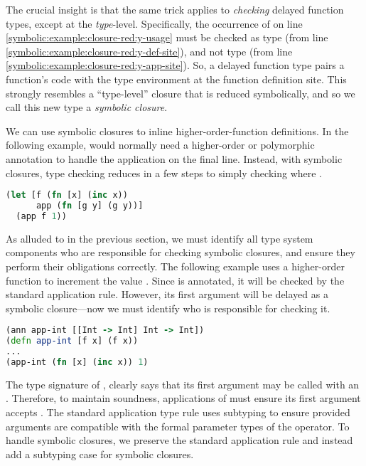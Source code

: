 The crucial insight is that
the same trick applies to \emph{checking} delayed function types,
except at the \emph{type}-level.
Specifically, the occurrence of 
on line \ref{symbolic:example:closure-red:y-usage}
must be checked as type  (from line \ref{symbolic:example:closure-red:y-def-site}),
and not type  (from line \ref{symbolic:example:closure-red:y-app-site}).
So, a delayed function type pairs a function's code with the type environment
at the function definition site.
This strongly resembles a ``type-level'' closure that is reduced symbolically,
and so we call this new type a \emph{symbolic closure}.

We can use symbolic closures to inline higher-order-function definitions.
In the following example,  would normally need a higher-order
or polymorphic
annotation to handle the application on the final line.
Instead, with symbolic closures, type checking reduces in a few steps to simply checking
 where .

\begin{lstlisting}[language=Clojure]
(let [f (fn [x] (inc x))
      app (fn [g y] (g y))]
  (app f 1))
\end{lstlisting}

As alluded to in the previous section, we must identify
all type system components who are responsible for checking symbolic closures,
and ensure they perform their obligations correctly.
The following example uses a higher-order function
 to increment the value .
Since  is annotated, it will be checked
by the standard application rule.
However, its first argument will be delayed as a symbolic
closure---now we must identify who is responsible for checking it.

\begin{lstlisting}[language=Clojure]
(ann app-int [[Int -> Int] Int -> Int])
(defn app-int [f x] (f x))
...
(app-int (fn [x] (inc x)) 1)
\end{lstlisting}

The type signature of ,
clearly says that its first argument may be called with an .
Therefore, to maintain soundness, applications of 
must ensure its first argument accepts .
The standard application type rule uses subtyping to ensure
provided arguments are compatible with the formal parameter types of
the operator.
To handle symbolic closures, we preserve the standard application rule
and instead add a subtyping case for symbolic closures.

